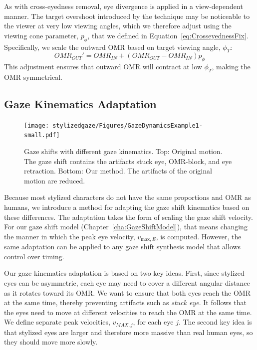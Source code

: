As with cross-eyedness removal, eye divergence is applied in a view-dependent manner. The target overshoot introduced by the technique may be noticeable to the viewer at very low viewing angles, which we therefore adjust using the viewing cone parameter, $p_{\phi}$, that we defined in Equation~\ref{eq:CrosseyednessFix}. Specifically, we scale the outward OMR based on target viewing angle, $\phi_T$:
%
\begin{equation}
OMR_{OUT}' = OMR_{IN} + (OMR_{OUT} - OMR_{IN}) p_{\phi}
\end{equation}
%
This adjustment ensures that outward OMR will contract at low $\phi_T$, making the OMR symmetrical.

\subsection{Gaze Kinematics Adaptation}

\begin{figure}
\centering
\texttt{[image: stylizedgaze/Figures/GazeDynamicsExample1-small.pdf]}
\caption{Gaze shifts with different gaze kinematics. Top: Original motion. The gaze shift contains the artifacts stuck eye, OMR-block, and eye retraction. Bottom: Our method. The artifacts of the original motion are reduced.}
\label{fig:GazeDynamicsExample}
\end{figure}

Because most stylized characters do not have the same proportions and OMR as humans, we introduce a method for adapting the gaze shift kinematics based on these differences. The adaptation takes the form of scaling the gaze shift velocity. For our gaze shift model (Chapter~\ref{cha:GazeShiftModel}), that means changing the manner in which the peak eye velocity, $v_{\mathrm{max},E}$, is computed. However, the same adaptation can be applied to any gaze shift synthesis model that allows control over timing.

Our gaze kinematics adaptation is based on two key ideas. First, since stylized eyes can be asymmetric, each eye may need to cover a different angular distance as it rotates toward its OMR. We want to ensure that both eyes reach the OMR at the same time, thereby preventing artifacts such as \emph{stuck eye}. It follows that the eyes need to move at different velocities to reach the OMR at the same time. We define separate peak velocities, $v_{MAX,j}$, for each eye $j$. The second key idea is that stylized eyes are larger and therefore more massive than real human eyes, so they should move more slowly.

